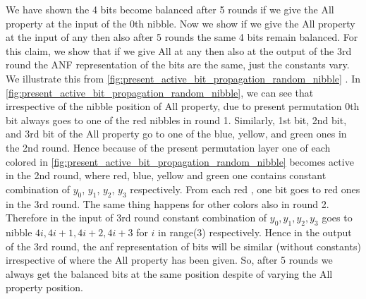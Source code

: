 We have shown the 4 bits become balanced after 5 rounds if we give the All property at the input of the 0th nibble. Now we show if we give the All property at the input of any \sbb then also after 5 rounds the same 4 bits remain balanced. For this claim, we show that if we give All at any \sbb then also at the output of the 3rd round the ANF representation of the bits are the same, just the constants vary. We illustrate this from \autoref{fig:present_active_bit_propagation_random_nibble} . In \autoref{fig:present_active_bit_propagation_random_nibble}, we can see that irrespective of the nibble position of All property, due to present permutation 0th bit always goes to one of the red nibbles in round 1. Similarly, 1st bit, 2nd bit, and 3rd bit of the All property go to one of the blue, yellow, and green ones in the 2nd round. Hence because of the present permutation layer one of each colored \sbb in \autoref{fig:present_active_bit_propagation_random_nibble} becomes active in the 2nd round, where red, blue, yellow and green one contains constant combination of $y_0$, $y_1$, $y_2$, $y_3$ respectively. From each red \sbb, one bit goes to red ones in the 3rd round. The same thing happens for other colors also in round 2. Therefore in the input of 3rd round constant combination of $y_0, y_1, y_2, y_3$ goes to nibble $4i, 4i+1, 4i+2, 4i+3$ for $i$ in range(3) respectively. Hence in the output of the 3rd round, the anf representation of bits will be similar (without constants) irrespective of where the All property has been given. So, after 5 rounds we always get the balanced bits at the same position despite of varying the All property position.
 


